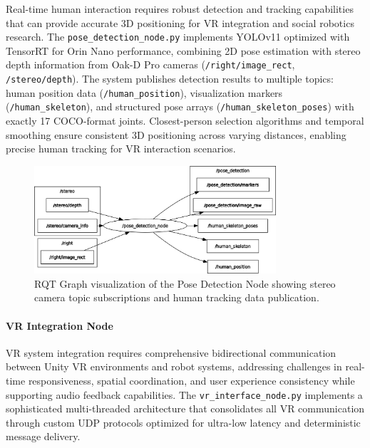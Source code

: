 Real-time human interaction requires robust detection and tracking capabilities that can provide accurate 3D positioning for VR integration and social robotics research. The \texttt{pose\_detection\_node.py} implements YOLOv11 optimized with TensorRT for Orin Nano performance, combining 2D pose estimation with stereo depth information from Oak-D Pro cameras (\texttt{/right/image\_rect}, \texttt{/stereo/depth}). The system publishes detection results to multiple topics: human position data \linebreak(\texttt{/human\_position}), visualization markers (\texttt{/human\_skeleton}), and structured pose arrays (\texttt{/human\_skeleton\_poses}) with exactly 17 COCO-format joints. Closest-person selection algorithms and temporal smoothing ensure consistent 3D positioning across varying distances, enabling precise human tracking for VR interaction scenarios.

\begin{figure}[H]
    \centering
    \includegraphics[width=0.8\textwidth]{Images/posenode.png}
    \caption{RQT Graph visualization of the Pose Detection Node showing stereo camera topic subscriptions and human tracking data publication.}
    \label{fig:rqt_pose_detection_node}
\end{figure}

\paragraph{VR Integration Node}

VR system integration requires comprehensive bidirectional communication between Unity VR environments and robot systems, addressing challenges in real-time responsiveness, spatial coordination, and user experience consistency while supporting audio feedback capabilities. The \texttt{vr\_interface\_node.py} implements a sophisticated multi-threaded architecture that consolidates all VR communication through custom UDP protocols optimized for ultra-low latency and deterministic message delivery.

